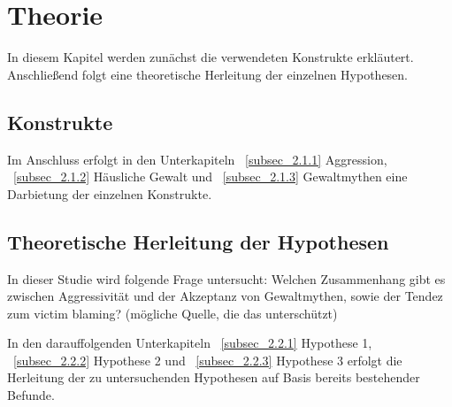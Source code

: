 

\chapter{Theorie}   \label{ch_2}
In diesem Kapitel werden zunächst die verwendeten Konstrukte erkläutert. Anschließend folgt
eine theoretische Herleitung der einzelnen Hypothesen.

\section{Konstrukte}    \label{sec_2.1}
Im Anschluss erfolgt in den Unterkapiteln ~\ref{subsec_2.1.1} Aggression, ~\ref{subsec_2.1.2} 
Häusliche Gewalt und ~\ref{subsec_2.1.3} Gewaltmythen eine Darbietung der einzelnen 
Konstrukte.





\section{Theoretische Herleitung der Hypothesen}   \label{sec_2.2}
In dieser Studie wird folgende Frage untersucht: Welchen Zusammenhang gibt es zwischen
Aggressivität und der Akzeptanz von Gewaltmythen, sowie der Tendez zum victim blaming?
(mögliche Quelle, die das unterschützt) 

In den darauffolgenden Unterkapiteln 
~\ref{subsec_2.2.1} Hypothese 1, ~\ref{subsec_2.2.2} Hypothese 2 und ~\ref{subsec_2.2.3} 
Hypothese 3 erfolgt die Herleitung der zu untersuchenden Hypothesen auf Basis bereits 
bestehender Befunde.



